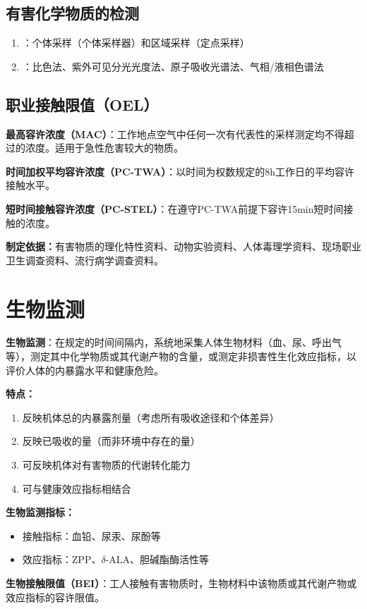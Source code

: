 \subsection{有害化学物质的检测}

\begin{enumerate}[leftmargin=*]
    \item {}：个体采样（个体采样器）和区域采样（定点采样）
    \item {}：比色法、紫外可见分光光度法、原子吸收光谱法、气相/液相色谱法
\end{enumerate}

\subsection{职业接触限值（OEL）}

\begin{defbox}
\textbf{最高容许浓度（MAC）}：工作地点空气中任何一次有代表性的采样测定均不得超过的浓度。适用于急性危害较大的物质。

\textbf{时间加权平均容许浓度（PC-TWA）}：以时间为权数规定的8h工作日的平均容许接触水平。

\textbf{短时间接触容许浓度（PC-STEL）}：在遵守PC-TWA前提下容许15min短时间接触的浓度。

\textbf{制定依据：}有害物质的理化特性资料、动物实验资料、人体毒理学资料、现场职业卫生调查资料、流行病学调查资料。
\end{defbox}

\section{生物监测}

\begin{defbox}
\textbf{生物监测}：在规定的时间间隔内，系统地采集人体生物材料（血、尿、呼出气等），测定其中化学物质或其代谢产物的含量，或测定非损害性生化效应指标，以评价人体的内暴露水平和健康危险。

\textbf{特点：}
\begin{enumerate}[leftmargin=*]
    \item 反映机体总的内暴露剂量（考虑所有吸收途径和个体差异）
    \item 反映已吸收的量（而非环境中存在的量）
    \item 可反映机体对有害物质的代谢转化能力
    \item 可与健康效应指标相结合
\end{enumerate}

\textbf{生物监测指标：}
\begin{itemize}[leftmargin=*]
    \item 接触指标：血铅、尿汞、尿酚等
    \item 效应指标：ZPP、$\delta$-ALA、胆碱酯酶活性等
\end{itemize}

\textbf{生物接触限值（BEI）}：工人接触有害物质时，生物材料中该物质或其代谢产物或效应指标的容许限值。
\end{defbox}

